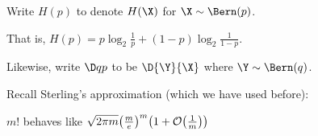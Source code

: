 \documentclass[class=co432,notes,tikz]{agony}
\begin{document}

\begin{notation}
  Write $H(p)$ to denote $H(\X)$ for $\X \sim \Bern(p)$.

  That is, $H(p) = p\log_2\frac1p + (1-p)\log_2\frac{1}{1-p}$.

  Likewise, write $\D q p$ to be $\D{\Y}{\X}$
  where $\Y \sim \Bern(q)$.
\end{notation}

Recall Sterling's approximation (which we have used before):

\begin{theorem}\label{thm:sterling}
  $m!$ behaves like $\sqrt{2\pi m}\qty(\frac{m}{e})^m\qty(1+\order{\frac{1}{m}})$
\end{theorem}
\end{document}

